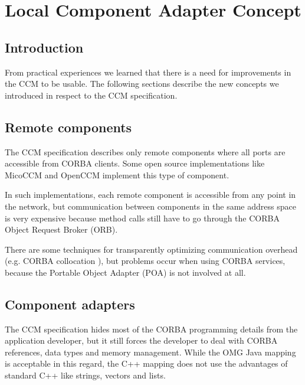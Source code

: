 \chapter{Local Component Adapter Concept}
\begin{flushright}
{\it }
\end{flushright}

\section{Introduction}
From practical experiences we learned that there is a need for improvements
in the CCM to be usable. The following sections describe the
new concepts we introduced in respect to the CCM specification.


\section{Remote components}

The CCM specification describes only remote components where all ports are
accessible from CORBA clients.
Some open source implementations like MicoCCM \cite{MicoCCM} and OpenCCM 
\cite{MarvieMerle2001} implement this type of component.

In such implementations, each remote component is accessible from any point 
in the network, but 
communication between components in the same address space is very
expensive because method calls still have to go through the CORBA Object
Request Broker (ORB).

There are some techniques for transparently optimizing communication overhead
(e.g. CORBA collocation \cite{ObjectInterconnections18, wang00optimizing}), but 
problems occur when using CORBA services,
because the Portable Object Adapter (POA) is not involved at all.


\section{Component adapters}
The CCM specification hides most of the CORBA programming details from the 
application developer, but it still forces
the developer to deal with CORBA references, data types and memory management.
While the OMG Java mapping \cite{OMGIDL2Java} is acceptable in this regard,
the C++ mapping \cite{OMGIDL2Cpp} 
does not use the advantages of standard C++ like strings, vectors and lists.

